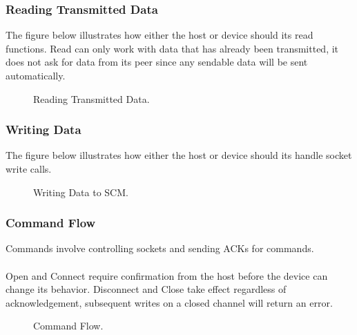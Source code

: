 \documentclass[10pt]{article}
\begin{document}
	\subsubsection{Reading Transmitted Data}
	The figure below illustrates how either the host or device should its read functions. Read can only work with data that has already been transmitted, it does not ask for data from its peer since any sendable data will be sent automatically. 
	\begin{figure}[H]
		\begin{center}
			\caption[Reading Transmitted Data.]{Reading Transmitted Data.}
			\resizebox{\linewidth}{!}{}
		\end{center}
	\end{figure}


	\subsubsection{Writing Data}
	The figure below illustrates how either the host or device should its handle socket write calls. 
	\begin{figure}[H]
	\begin{center}
		\caption[Writing Data to SCM.]{Writing Data to SCM.}
		\resizebox{\linewidth}{!}{}
	\end{center}
	\end{figure}

\subsubsection{Command Flow}
Commands involve controlling sockets and sending ACKs for commands. \\
\\
Open and Connect require confirmation from the host before the device can change its behavior. Disconnect and Close take effect regardless of acknowledgement, subsequent writes on a closed channel will return an error.
\begin{figure}[H]
	\begin{center}
		\caption[Command Flow.]{Command Flow.}
		\resizebox{\linewidth}{!}{}
	\end{center}
\end{figure}
\end{document}
